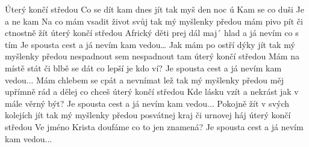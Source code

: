 \begin{TEXT}{Úterý končí středou}
\SLOKA Co  se dít kam  dnes jít\NL
tak  myš \NL
den  noc \NL
ú  \NL
Kam   se  co  duši \NL
Je   a  ne kam 
\SLOKA Na co mám vsadit život svůj\NL
tak mý myšlenky předou\NL
mám pivo pít či ctnostně žít\NL
úterý končí středou\NL
Africký děti prej dál maj´ hlad a já nevím co s tím\NL
Je spousta cest a já nevím kam vedou…
\SLOKA Jak mám po ostří dýky jít\NL
tak mý myšlenky předou\NL
nespadnout sem nespadnout tam\NL
úterý končí středou\NL
Mám na místě stát či blbě se dát co lepší je kdo ví?\NL
Je spousta cest a já nevím kam vedou...
\SLOKA Mám chlebem se cpát a nevnímat lež\NL
tak mý myšlenky předou\NL
měj upřímně rád a dělej co chceš\NL
úterý končí středou\NL
Kde lásku vzít a nekrást jak v mále věrný být?\NL
Je spousta cest a já nevím kam vedou...
\SLOKA Pokojně žít v svých kolejích jít\NL
tak mý myšlenky předou\NL
posvátnej kraj či urnovej háj\NL
úterý končí středou\NL
Ve jméno Krista doufáme co to jen znamená?\NL
Je spousta cest a já nevím kam vedou...
\end{TEXT}